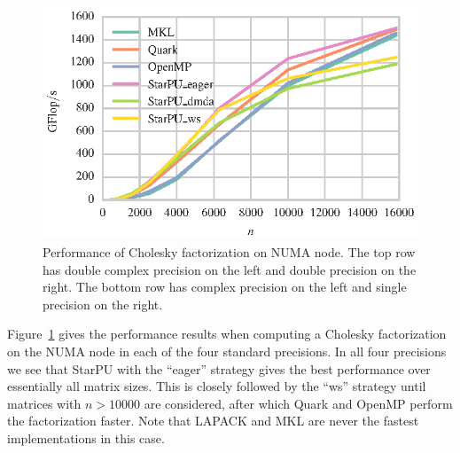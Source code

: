 \documentclass[a4paper,12pt]{article}
\begin{document}
\begin{figure}[t]
  \includegraphics[scale=.85]{fig/kebnekaise_spotrf_weak_scaling.eps}
  \caption{Performance of Cholesky factorization on NUMA node.
    The top row has double complex precision on the left and double
    precision on the right.
    The bottom row has complex precision on the left and single
    precision on the right.}
  \label{fig.chol_numa}
\end{figure}

Figure~\ref{fig.chol_numa} gives the performance results
when computing a Cholesky factorization on the NUMA node
in each of the four standard precisions.
In all four precisions we see that StarPU with
the ``eager'' strategy gives the best performance over
essentially all matrix sizes.
This is closely followed by the ``ws'' strategy
until matrices with $n > 10000$ are considered,
after which Quark and OpenMP perform the factorization faster.
Note that LAPACK and MKL are never the fastest implementations
in this case.
\end{document}
